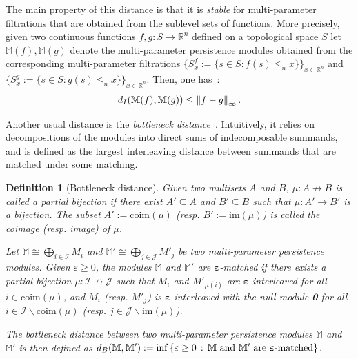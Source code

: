 \documentclass{article}
\newcommand{\norm}[1]{\left\lVert #1 \right\rVert}
\newcommand{\simpcomp}{S}
\newcommand{\summand}{M}
\newcommand{\R}{\mathbb{R}}
\newcommand{\Mbb}{\mathbb{M}}
\newcommand{\disti}{{d_{\rm I}}}
\newcommand{\distb}{{d_{\rm B}}}
\newcommand{\leqn}{\leq_n}
\newtheorem{definition}{Definition}%
\newcommand{\rebuttal}[1]{{ #1}}
\begin{document}
The main property of this distance is that it is {\em stable} for multi-parameter filtrations that are
obtained from the sublevel sets of functions. More precisely, given two continuous functions $f,g:\simpcomp\to\R^n$ defined on a \rebuttal{topological space}
$\simpcomp$
let $\Mbb(f),\Mbb(g)$ denote the multi-parameter persistence modules obtained from the corresponding multi-parameter filtrations
$\{\simpcomp^f_x:=\{s \in \simpcomp : f(s)\leqn x\}\}_{x\in\R^n}$ and
$\{\simpcomp_x^g:=\{s \in \simpcomp : g(s)\leqn x\}\}_{x\in\R^n}$.
Then, one has~\cite[Theorem 5.3]{lesnickTheoryInterleavingDistance2015}:
\begin{equation}\label{eq:stability}
	\disti(\Mbb(f),\Mbb(g))\leq \norm{f-g}_\infty.
\end{equation}

Another usual distance is the {\em bottleneck distance}~\cite[Section 2.3]{botnanAlgebraicStabilityZigzag2018}.
Intuitively, it relies on decompositions of the modules into direct sums of indecomposable summands,
and is defined as the largest interleaving
distance between summands that are matched under some matching. \\







\begin{definition}[Bottleneck distance] \label{def:bottleneck_distance}
	Given two multisets $A$ and $B$, $ \mu \colon A\not\to B $ is called a
	\rebuttal{{\em partial bijection}} if there exist $A' \subseteq A$ and $B'\subseteq B$ such that $\mu\colon A'\to B'$ is a bijection. The
	subset $A':=\mathrm{ coim}( \mu)$ (resp. $B':= \mathrm{ im}(\mu)$) is called the {\em coimage} (resp. {\em image}) of $\mu$.

	Let $\Mbb \cong \bigoplus_{i\in \mathcal{I}}\summand_i$ and $\Mbb' \cong \bigoplus_{j\in \mathcal{J}}\summand'_j$ be two multi-parameter persistence modules. %
	Given $\varepsilon\geq 0$, the modules $\Mbb$ and $\Mbb'$ are
	$\boldsymbol\varepsilon$-\emph{matched} if there exists a \rebuttal{partial bijection} $\mu \colon \mathcal{I}\not\to \mathcal{J}$ such that
	$M_i$ and $M'_{\mu(i)}$ are $ \boldsymbol\varepsilon$-interleaved for all
	$i\in\mathrm{ coim}(\mu)$, and $M_i$ (resp. $M'_j$) is
	$\boldsymbol\varepsilon$-interleaved with the null module {\bf 0} for all $i\in\mathcal{I}\backslash \mathrm{ coim}(\mu)$ (resp. $j\in \mathcal{J}\backslash \mathrm{ im}(\mu)$).

	The {\em bottleneck distance} %
	between two multi-parameter persistence modules $\Mbb$ and $\Mbb'$ is then defined as
	$
	\distb(\Mbb,\Mbb') := \inf \left\{ \varepsilon\ge 0 \,:\, \Mbb \text{ and } \Mbb' \text{ are  }\boldsymbol \varepsilon \text{-matched}\right\}. \\
	$
\end{definition}
\end{document}
